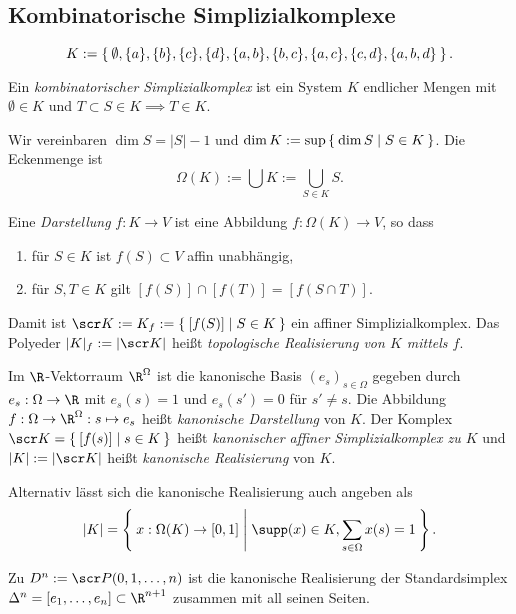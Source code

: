 \subsection{Kombinatorische Simplizialkomplexe}

\[
	K := \Set{ \emptyset, \{a\}, \{b\}, \{c\}, \{d\}, \{a,b\}, \{b,c\}, \{a,c\}, \{c,d\}, \{a,b,d\} }.
\]

\begin{df}
	Ein \emph{kombinatorischer Simplizialkomplex} ist ein System $K$ endlicher Mengen mit $\emptyset \in K$ und $T \subset S \in K \implies T \in K$.

	Wir vereinbaren $\dim S = |S| - 1$ und $\dim K := \sup \Set{ \dim S | S \in K }$.
	Die Eckenmenge ist
	\[
		\Omega(K) := \bigcup K := \bigcup_{S \in K} S.
	\]
\end{df}

\begin{df}
	Eine \emph{Darstellung} $f: K \to V$ ist eine Abbildung $f: \Omega(K) \to V$, so dass
	\begin{enumerate}[1)]
		\item
			für $S \in K$ ist $f(S) \subset V$ affin unabhängig,
		\item
			für $S, T \in K$ gilt $[f(S)] \cap [f(T)] = [f(S \cap T)]$.
	\end{enumerate}
	Damit ist $\scr K := K_f := \Set{ [f(S)] | S \in K }$ ein affiner Simplizialkomplex.
	Das Polyeder $|K|_f := |\scr K|$ heißt \emph{topologische Realisierung von $K$ mittels $f$}.
\end{df}

\begin{df}
	Im $\R$-Vektorraum $\R^\Omega$ ist die kanonische Basis $(e_s)_{s \in \Omega}$ gegeben durch $e_s: \Omega \to \R$ mit $e_s(s) = 1$ und $e_s(s') = 0$ für $s' \neq s$.
	Die Abbildung $f: \Omega \to \R^\Omega: s \mapsto e_s$ heißt \emph{kanonische Darstellung} von $K$.
	Der Komplex $\scr K = \Set{ [f(s)] | s \in K}$ heißt \emph{kanonischer affiner Simplizialkomplex zu $K$} und $|K| := |\scr K|$ heißt \emph{kanonische Realisierung} von $K$.
\end{df}

\begin{nt}
	Alternativ lässt sich die kanonische Realisierung auch angeben als
	\[
		|K| = \Set{ x: \Omega(K) \to [0,1] | \supp(x) \in K, \sum_{s \in \Omega} x(s) = 1 }.
	\]
\end{nt}

\begin{ex}
	Zu $D^n := \scr P({0, 1, \dotsc, n})$ ist die kanonische Realisierung der Standardsimplex $\Delta^n = [e_1, \dotsc, e_n] \subset \R^{n+1}$ zusammen mit all seinen Seiten.
\end{ex}


